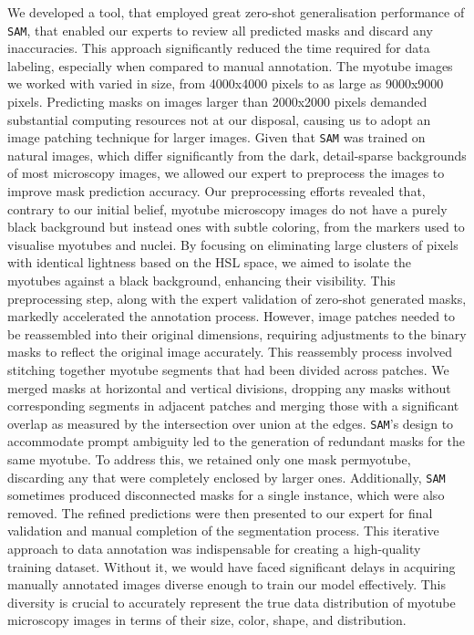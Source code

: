We developed a tool, that employed great zero-shot generalisation performance of \texttt{SAM}, that enabled our experts to review all predicted masks and discard any inaccuracies. This approach significantly reduced the time required for data labeling, especially when compared to manual annotation. The myotube images we worked with varied in size, from 4000x4000 pixels to as large as 9000x9000 pixels. Predicting masks on images larger than 2000x2000 pixels demanded substantial computing resources not at our disposal, causing us to adopt an image patching technique for larger images.
Given that \texttt{SAM} was trained on natural images, which differ significantly from the dark, detail-sparse backgrounds of most microscopy images, we allowed our expert to preprocess the images to improve mask prediction accuracy. Our preprocessing efforts revealed that, contrary to our initial belief, myotube microscopy images do not have a purely black background but instead ones with subtle coloring, from the markers used to visualise myotubes and nuclei. By focusing on eliminating large clusters of pixels with identical lightness based on the HSL space, we aimed to isolate the myotubes against a black background, enhancing their visibility. This preprocessing step, along with the expert validation of zero-shot generated masks, markedly accelerated the annotation process.
However, image patches needed to be reassembled into their original dimensions, requiring adjustments to the binary masks to reflect the original image accurately. This reassembly process involved stitching together myotube segments that had been divided across patches. We merged masks at horizontal and vertical divisions, dropping any masks without corresponding segments in adjacent patches and merging those with a significant overlap as measured by the intersection over union at the edges.
\texttt{SAM}'s design to accommodate prompt ambiguity led to the generation of redundant masks for the same myotube. To address this, we retained only one mask permyotube, discarding any that were completely enclosed by larger ones. Additionally, \texttt{SAM} sometimes produced disconnected masks for a single instance, which were also removed.
The refined predictions were then presented to our expert for final validation and manual completion of the segmentation process. This iterative approach to data annotation was indispensable for creating a high-quality training dataset. Without it, we would have faced significant delays in acquiring manually annotated images diverse enough to train our model effectively. This diversity is crucial to accurately represent the true data distribution of myotube microscopy images in terms of their size, color, shape, and distribution.

